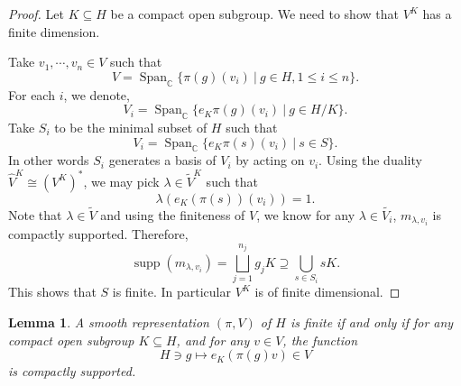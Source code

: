 \documentclass[8pt]{article}
\newtheorem{lemma}{Lemma}[section]
\DeclareMathOperator{\Span}{Span}
\DeclareMathOperator{\supp}{supp}
\newcommand{\C}[0]{\mathbb{C}}
\newcommand{\sep}[0]{\:|\:}
\begin{document}
\begin{proof}
Let $K\subseteq H$ be a compact open subgroup. We need to show that $V^K$ has a finite dimension.
\par Take $v_1,\cdots,v_n\in V$ such that
\begin{equation*}
V = \Span_\C\{\pi(g)(v_i)\:|\: g\in H,1\leq i\leq n\}.
\end{equation*} 
For each $i$, we denote,
\begin{equation*}
V_i = \Span_\C\{e_{K}\pi(g)(v_i)\sep g\in H/K \}.
\end{equation*}
Take $S_i$ to be the minimal subset of $H$ such that 
\begin{equation*}
  V_i = \Span_\C\{e_K\pi(s)(v_i)\sep s\in S\}.
\end{equation*}
In other words $S_i$ generates a basis of $V_i$ by acting on $v_i$.
Using the duality $\widehat{V}^K\cong (V^K)^*$, we may pick $\lambda\in \widetilde{V}^K$ such that 
\begin{equation*}
  \lambda(e_K(\pi(s))(v_i)) = 1.
\end{equation*}
Note that $\lambda\in \widetilde{V}$ and using the finiteness of $V$, we know for any $\lambda\in\widetilde{V_i}$, $m_{\lambda,v_i}$ is compactly supported. Therefore,
\begin{equation*}
  \supp(m_{\lambda,v_i}) = \bigsqcup_{j=1}^{n_j} g_jK \supseteq \bigcup_{s\in S_i}sK.
\end{equation*}
This shows that $S$ is finite. In particular $V^K$ is of finite dimensional.

\end{proof}
\begin{lemma}
  A smooth representation $(\pi,V)$ of $H$ is finite if and only if for any compact open subgroup $K\subseteq H$, and for any $v\in V$, the function
  \begin{equation*}
    H\ni g\mapsto e_K(\pi(g)v)\in V
  \end{equation*}
  is compactly supported.
\end{lemma}
\end{document}
